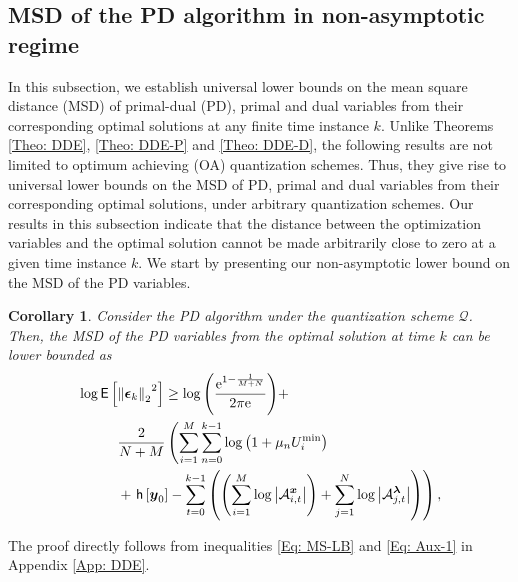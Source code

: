 \documentclass[10pt,twocolumn,twoside]{IEEEtran}
\newtheorem{corollary}{Corollary}
\begin{document}
\subsection{MSD of the PD algorithm in non-asymptotic regime}
In this subsection, we establish universal lower bounds on the mean square distance (MSD) of primal-dual (PD), primal and dual variables from their corresponding optimal solutions at any finite time instance $k$. Unlike Theorems \ref{Theo: DDE}, \ref{Theo: DDE-P} and \ref{Theo: DDE-D}, the following results are not limited to optimum achieving (OA) quantization schemes. Thus, they give rise to universal lower bounds on the MSD of PD, primal and dual variables from their corresponding optimal solutions, under arbitrary quantization schemes. Our results in this subsection indicate that the distance between the optimization variables and the  optimal solution cannot be made arbitrarily close to zero at a given time instance $k$.  
We start by presenting our non-asymptotic lower bound on the MSD of the PD variables.
\begin{corollary}\label{Coro: FTE}
Consider the PD algorithm under the quantization scheme $\mathcal{Q}$. Then, the MSD of the PD variables from the optimal solution at time $k$ can be lower bounded as
\begin{align}\label{Eq: LB-G}
&\log{\ensuremath{\mathsf{E}\left[{{\left\Vert{{\ensuremath{\boldsymbol{{\epsilon}}}}_k}\right\Vert_{{2}}}^2} \right]}}\geq {\ensuremath{\log{\left({{\frac{{\ensuremath{{\rm e}^{{1-\frac{1}{M+N}}}}}}{{2\pi {\ensuremath{{\rm e}^{{}}}}}}}}\right)}}}+ \nonumber\\
&\hspace{1cm}\frac{2}{N+M}\left(\sum_{i=1}^M\sum_{n=0}^{k-1}{{\ensuremath{\log{\left({{1+\mu_nU^{\min}_i}}\right)}}}}\right.\nonumber\\
&\hspace{1cm}+\left.\mathsf{h}\left[{\ensuremath{\boldsymbol{{y}}}}_{0}\right]-\sum_{t=0}^{k-1}{\left({{\left({\sum_{i=1}^M\log{\left|{\mathcal{A}^{{\ensuremath{\boldsymbol{{x}}}}}_{i,t}}\right|}}\right)}+\sum_{j=1}^N\log{\left|{\mathcal{A}^{{\ensuremath{\boldsymbol{{\lambda}}}}}_{j,t}}\right|}}\right)}\right),
\end{align}
\end{corollary}
\begin{IEEEproof}
The proof directly follows from inequalities \eqref{Eq: MS-LB} and \eqref{Eq: Aux-1} in Appendix \ref{App: DDE}.
\end{IEEEproof}
\end{document}
